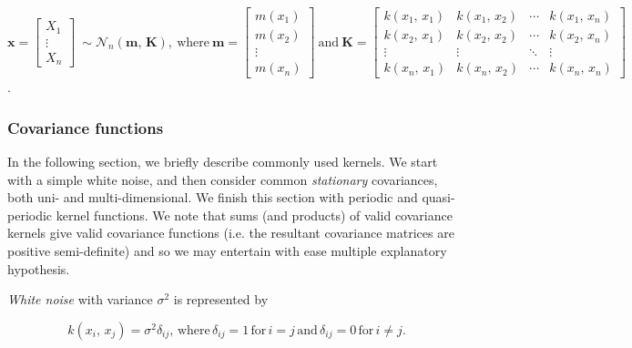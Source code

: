       \(\mathbf{x} =
      \begin{bmatrix}
         X_{1} \\
         \vdots \\
         X_{n}
      \end{bmatrix}
      \:
      \sim \mathcal{N}_{n}(\mathbf{m}, \, \mathbf{K}),
      \:
      \text{where}
      \:
      \mathbf{m} = 
      \begin{bmatrix}
         m(x_{1}) \\
         m(x_{2}) \\
         \vdots \\
         m(x_{n})
      \end{bmatrix}  
      \: 
      \text{and}
      \:
      \mathbf{K} = 
      \begin{bmatrix}
         k(x_{1}, \, x_{1}) & k(x_{1}, \, x_{2}) & \cdots & k(x_{1}, \, x_{n}) \\
         k(x_{2}, \, x_{1}) & k(x_{2}, \, x_{2}) & \cdots & k(x_{2}, \, x_{n}) \\
         \vdots & \vdots & \ddots & \vdots \\
         k(x_{n}, \, x_{1}) & k(x_{n}, \, x_{2}) & \cdots & k(x_{n}, \, x_{n})
      \end{bmatrix}\).

      \subsubsection{Covariance functions}

         \cite{Roberts2013} In the following section, we briefly describe commonly used kernels. We start with a simple white noise, and then consider common \textit{stationary} covariances, both uni- and multi-dimensional. We finish this section with periodic and quasi-periodic kernel functions. We note that sums (and products) of valid covariance kernels give valid covariance functions (i.e. the resultant covariance matrices are positive semi-definite) and so we may entertain with ease multiple explanatory hypothesis. 

         \vspace{1em}

         \textit{White noise} with variance \(\sigma^2\) is represented by
         
         \[k(x_{i}, \, x_{j}) = \sigma^2\delta_{ij}, \, \text{where} \, \delta_{ij} = 1 \, \text{for} \, i = j \, \text{and} \, \delta_{ij} = 0 \, \text{for} \, i \neq j.\]

